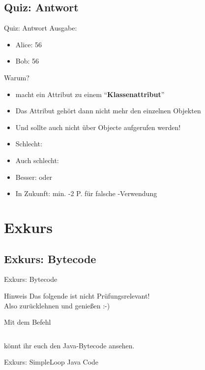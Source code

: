 \documentclass[usepdftitle=false,hyperref={pdfpagelabels=false}]{beamer}
\begin{document}
\subsection{Quiz: Antwort}
\begin{frame}{Quiz: Antwort}
    Ausgabe:
    \begin{itemize}
      \item Alice: 56
      \item Bob: 56
    \end{itemize}
    \vspace{0.5cm}
    Warum?
    \begin{itemize}[<+->]
      \item {} macht ein Attribut zu einem "`\textbf{Klassenattribut}"'
      \item Das Attribut gehört dann nicht mehr den einzelnen Objekten
      \item Und sollte auch nicht über Objecte aufgerufen werden!
      \item Schlecht: 
      \item Auch schlecht: 
      \item Besser:  oder 
      \item In Zukunft: min. -2 P. für falsche -Verwendung
    \end{itemize}
\end{frame}

\section{Exkurs}
\subsection{Exkurs: Bytecode}
\begin{frame}{Exkurs: Bytecode}
    \begin{alertblock}{Hinweis}
        Das folgende ist nicht Prüfungsrelevant!\\
        Also zurücklehnen und genießen :-)
    \end{alertblock}

    \vspace{1cm}
    Mit dem Befehl
    \inputminted[linenos=false, numbersep=5pt, tabsize=4, firstline=1, lastline=1]{bash}{bash.sh}
    könnt ihr euch den Java-Bytecode ansehen.
\end{frame}

\begin{frame}{Exkurs: SimpleLoop Java Code}
    \inputminted[linenos=true, numbersep=5pt, tabsize=4, label=SimpleLoop.java, frame=lines]{java}{SimpleLoop.java}
\end{frame}
\end{document}
